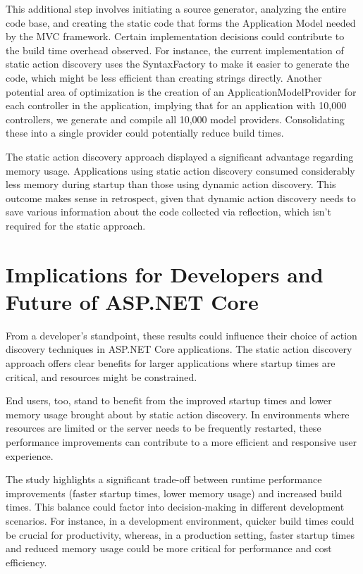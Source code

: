This additional step involves initiating a source generator, analyzing the entire code base, and creating the static code that forms the Application Model needed by the MVC framework. Certain implementation decisions could contribute to the build time overhead observed. For instance, the current implementation of static action discovery uses the SyntaxFactory to make it easier to generate the code, which might be less efficient than creating strings directly. Another potential area of optimization is the creation of an ApplicationModelProvider for each controller in the application, implying that for an application with 10,000 controllers, we generate and compile all 10,000 model providers. Consolidating these into a single provider could potentially reduce build times.

The static action discovery approach displayed a significant advantage regarding memory usage. Applications using static action discovery consumed considerably less memory during startup than those using dynamic action discovery. This outcome makes sense in retrospect, given that dynamic action discovery needs to save various information about the code collected via reflection, which isn't required for the static approach.

\section{Implications for Developers and Future of ASP.NET Core}

From a developer's standpoint, these results could influence their choice of action discovery techniques in ASP.NET Core applications. The static action discovery approach offers clear benefits for larger applications where startup times are critical, and resources might be constrained.

End users, too, stand to benefit from the improved startup times and lower memory usage brought about by static action discovery. In environments where resources are limited or the server needs to be frequently restarted, these performance improvements can contribute to a more efficient and responsive user experience.

The study highlights a significant trade-off between runtime performance improvements (faster startup times, lower memory usage) and increased build times. This balance could factor into decision-making in different development scenarios. For instance, in a development environment, quicker build times could be crucial for productivity, whereas, in a production setting, faster startup times and reduced memory usage could be more critical for performance and cost efficiency.

